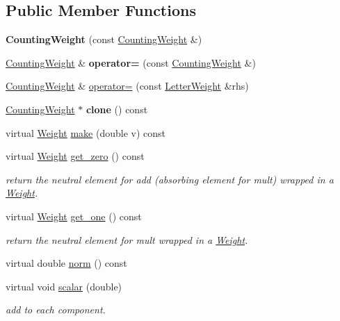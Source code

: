 \subsection*{Public Member Functions}
\begin{DoxyCompactItemize}
\item 
{\bfseries Counting\+Weight} (const \mbox{\hyperlink{classCountingWeight}{Counting\+Weight}} \&)
\item 
\mbox{\hyperlink{classCountingWeight}{Counting\+Weight}} \& {\bfseries operator=} (const \mbox{\hyperlink{classCountingWeight}{Counting\+Weight}} \&)
\item 
\mbox{\hyperlink{classCountingWeight}{Counting\+Weight}} \& \mbox{\hyperlink{group__weight_gabde05f9a8f2eb526e5154c4f3480205b}{operator=}} (const \mbox{\hyperlink{classLetterWeight}{Letter\+Weight}} \&rhs)
\item 
\mbox{\hyperlink{classCountingWeight}{Counting\+Weight}} $\ast$ {\bfseries clone} () const
\item 
virtual \mbox{\hyperlink{classWeight}{Weight}} \mbox{\hyperlink{group__weight_ga1d225aef0e74c70d8ae73164de4f56e2}{make}} (double v) const
\item 
virtual \mbox{\hyperlink{classWeight}{Weight}} \mbox{\hyperlink{group__weight_ga76eb9cd401bbeba9450469a889dfb7eb}{get\+\_\+zero}} () const
\begin{DoxyCompactList}\small\item\em return the neutral element for add (absorbing element for mult) wrapped in a \mbox{\hyperlink{classWeight}{Weight}}. \end{DoxyCompactList}\item 
virtual \mbox{\hyperlink{classWeight}{Weight}} \mbox{\hyperlink{group__weight_ga0a589d8beac0f16f54f7e4f451adc843}{get\+\_\+one}} () const
\begin{DoxyCompactList}\small\item\em return the neutral element for mult wrapped in a \mbox{\hyperlink{classWeight}{Weight}}. \end{DoxyCompactList}\item 
virtual double \mbox{\hyperlink{group__weight_gabb8ca43a6821de970e8f6b23c848c804}{norm}} () const
\item 
virtual void \mbox{\hyperlink{group__weight_gabb65ce9f0f34112159f6689a36594470}{scalar}} (double)
\begin{DoxyCompactList}\small\item\em add to each component. \end{DoxyCompactList}\item 

\end{DoxyCompactItemize}
